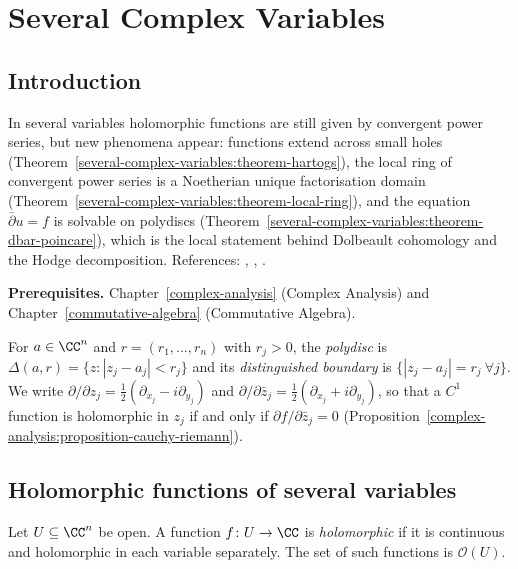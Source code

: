 \chapter{Several Complex Variables}\label{several-complex-variables}

\section{Introduction}\label{several-complex-variables:section-introduction}

In several variables holomorphic functions are still given by convergent power series, but new phenomena appear: functions extend
across small holes (Theorem~\ref{several-complex-variables:theorem-hartogs}), the local ring of convergent power series is a
Noetherian unique factorisation domain (Theorem~\ref{several-complex-variables:theorem-local-ring}), and the equation
$\bar\partial u = f$ is solvable on polydiscs (Theorem~\ref{several-complex-variables:theorem-dbar-poincare}), which is the local
statement behind Dolbeault cohomology and the Hodge decomposition. References: \cite{hormander-scv}, \cite{gunning-rossi},
\cite[Chapter 0]{griffiths-harris}.

\noindent\textbf{Prerequisites.} Chapter~\ref{complex-analysis} (Complex Analysis) and Chapter~\ref{commutative-algebra} (Commutative Algebra).

For $a \in \CC^n$ and $r = (r_1, \ldots, r_n)$ with $r_j > 0$, the \emph{polydisc} is $\Delta(a, r) = \{z : |z_j - a_j| < r_j\}$ and its
\emph{distinguished boundary} is $\{|z_j - a_j| = r_j \ \forall j\}$. We write $\partial/\partial z_j = \frac12(\partial_{x_j} - i\partial_{y_j})$ and
$\partial/\partial\bar z_j = \frac12(\partial_{x_j} + i\partial_{y_j})$, so that a $C^1$ function is holomorphic in $z_j$ if and only if
$\partial f/\partial\bar z_j = 0$ (Proposition~\ref{complex-analysis:proposition-cauchy-riemann}).

\section{Holomorphic functions of several variables}\label{several-complex-variables:section-holomorphic}

\begin{definition}\label{several-complex-variables:definition-holomorphic}
Let $U \subseteq \CC^n$ be open. A function $f \colon U \to \CC$ is \emph{holomorphic} if it is continuous and holomorphic in each variable separately. The set of such functions is
$\mathcal{O}(U)$.
\end{definition}


